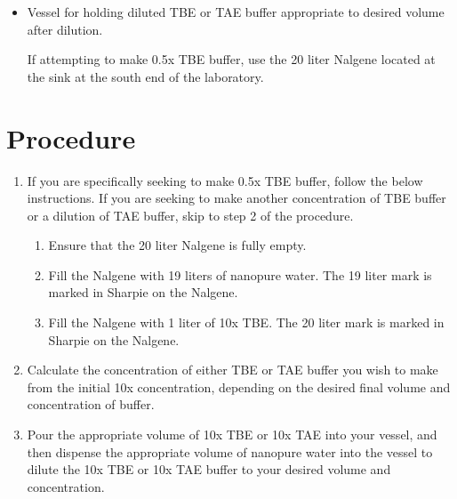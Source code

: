 \documentclass[
  letterpaper,
  DIV=11,
  numbers=noendperiod]{scrreprt}
\providecommand{\tightlist}{%
  \setlength{\itemsep}{0pt}\setlength{\parskip}{0pt}}\usepackage{longtable,booktabs,array}
\begin{document}
\begin{itemize}
\item
  Vessel for holding diluted TBE or TAE buffer appropriate to desired
  volume after dilution.

  \begin{tcolorbox}[enhanced jigsaw, rightrule=.15mm, title=\textcolor{quarto-callout-important-color}{\faExclamation}\hspace{0.5em}{NOTE}, titlerule=0mm, opacitybacktitle=0.6, toprule=.15mm, bottomrule=.15mm, opacityback=0, left=2mm, colframe=quarto-callout-important-color-frame, breakable, coltitle=black, colback=white, colbacktitle=quarto-callout-important-color!10!white, bottomtitle=1mm, leftrule=.75mm, toptitle=1mm, arc=.35mm]

  If attempting to make 0.5x TBE buffer, use the 20 liter Nalgene
  located at the sink at the south end of the laboratory.

  \end{tcolorbox}
\end{itemize}

\hypertarget{procedure-97}{%
\section{Procedure}\label{procedure-97}}

\begin{enumerate}
\def\labelenumi{\arabic{enumi}.}
\tightlist
\item
  If you are specifically seeking to make 0.5x TBE buffer, follow the
  below instructions. If you are seeking to make another concentration
  of TBE buffer or a dilution of TAE buffer, skip to step 2 of the
  procedure.

  \begin{enumerate}
  \def\labelenumii{\alph{enumii}.}
  \tightlist
  \item
    Ensure that the 20 liter Nalgene is fully empty.
  \item
    Fill the Nalgene with 19 liters of nanopure water. The 19 liter mark
    is marked in Sharpie on the Nalgene.
  \item
    Fill the Nalgene with 1 liter of 10x TBE. The 20 liter mark is
    marked in Sharpie on the Nalgene.
  \end{enumerate}
\item
  Calculate the concentration of either TBE or TAE buffer you wish to
  make from the initial 10x concentration, depending on the desired
  final volume and concentration of buffer.
\item
  Pour the appropriate volume of 10x TBE or 10x TAE into your vessel,
  and then dispense the appropriate volume of nanopure water into the
  vessel to dilute the 10x TBE or 10x TAE buffer to your desired volume
  and concentration.
\end{enumerate}
\end{document}
